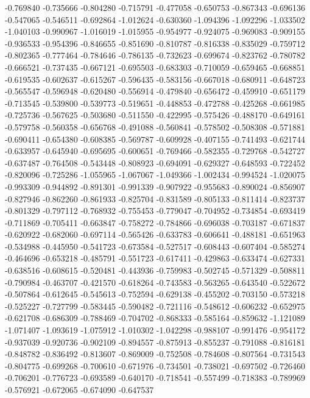 -0.769840
-0.735666
-0.804280
-0.715791
-0.477058
-0.650753
-0.867343
-0.696136
-0.547065
-0.546511
-0.692864
-1.012624
-0.630360
-1.094396
-1.092296
-1.033502
-1.040103
-0.990967
-1.016019
-1.015955
-0.954977
-0.924075
-0.969083
-0.909155
-0.936533
-0.954396
-0.846655
-0.851690
-0.810787
-0.816338
-0.835029
-0.759712
-0.802365
-0.777464
-0.784646
-0.786135
-0.732623
-0.699674
-0.823762
-0.780782
-0.666521
-0.737435
-0.667121
-0.695503
-0.683303
-0.710059
-0.659465
-0.668851
-0.619535
-0.602637
-0.615267
-0.596435
-0.583156
-0.667018
-0.680911
-0.648723
-0.565547
-0.596948
-0.620480
-0.556914
-0.479840
-0.656472
-0.459910
-0.651179
-0.713545
-0.539800
-0.539773
-0.519651
-0.448853
-0.472788
-0.425268
-0.661985
-0.725736
-0.567625
-0.503680
-0.511550
-0.422995
-0.575426
-0.488170
-0.649161
-0.579758
-0.560358
-0.656768
-0.491088
-0.560841
-0.578502
-0.508308
-0.571881
-0.690411
-0.654380
-0.608385
-0.569787
-0.609928
-0.407155
-0.741493
-0.621744
-0.633957
-0.645940
-0.695695
-0.600651
-0.769466
-0.582355
-0.729768
-0.542727
-0.637487
-0.764508
-0.543448
-0.808923
-0.694091
-0.629327
-0.648593
-0.722452
-0.820096
-0.725286
-1.055965
-1.067067
-1.049366
-1.002434
-0.994524
-1.020075
-0.993309
-0.944892
-0.891301
-0.991339
-0.907922
-0.955683
-0.890024
-0.856907
-0.827946
-0.862260
-0.861933
-0.825704
-0.831589
-0.805133
-0.811414
-0.823737
-0.801329
-0.797112
-0.768932
-0.755453
-0.779047
-0.704952
-0.734854
-0.693419
-0.711869
-0.705411
-0.663847
-0.758272
-0.784866
-0.696038
-0.703187
-0.671837
-0.620922
-0.682060
-0.697114
-0.565426
-0.633783
-0.606641
-0.488181
-0.651963
-0.534988
-0.445950
-0.541723
-0.673584
-0.527517
-0.608443
-0.607404
-0.585274
-0.464696
-0.653218
-0.485791
-0.551723
-0.617411
-0.429863
-0.633474
-0.627331
-0.638516
-0.608615
-0.520481
-0.443936
-0.759983
-0.502745
-0.571329
-0.508811
-0.790984
-0.463707
-0.421570
-0.618264
-0.743583
-0.563265
-0.643540
-0.522672
-0.507864
-0.612645
-0.545613
-0.752594
-0.629138
-0.455202
-0.703150
-0.573218
-0.525227
-0.727799
-0.583445
-0.590482
-0.721116
-0.548612
-0.606232
-0.652975
-0.621708
-0.686309
-0.788469
-0.704702
-0.868333
-0.585164
-0.859632
-1.121089
-1.071407
-1.093619
-1.075912
-1.010302
-1.042298
-0.988107
-0.991476
-0.954172
-0.937039
-0.920736
-0.902109
-0.894557
-0.875913
-0.855237
-0.791088
-0.816181
-0.848782
-0.836492
-0.813607
-0.869009
-0.752508
-0.784608
-0.807564
-0.731543
-0.804775
-0.699268
-0.700610
-0.671976
-0.734501
-0.738021
-0.697502
-0.726460
-0.706201
-0.776723
-0.693589
-0.640170
-0.718541
-0.557499
-0.718383
-0.789969
-0.576921
-0.672065
-0.674090
-0.647537
